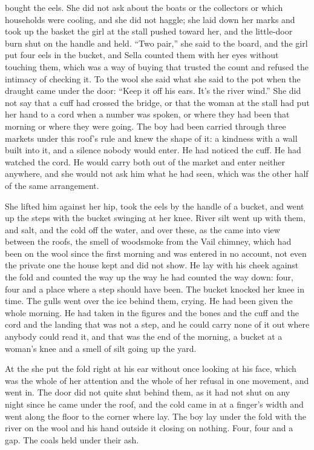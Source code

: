 \scenebreak

 bought the eels. She did not ask about the boats or the collectors or which households were cooling, and she did not haggle; she laid down her marks and took up the basket the girl at the stall pushed toward her, and the little-door burn shut on the handle and held. “Two pair,” she said to the board, and the girl put four eels in the bucket, and Sella counted them with her eyes without touching them, which was a way of buying that trusted the count and refused the intimacy of checking it. To the wool she said what she said to the pot when the draught came under the door: “Keep it off his ears. It's the river wind.” She did not say that a cuff had crossed the bridge, or that the woman at the stall had put her hand to a cord when a number was spoken, or where they had been that morning or where they were going. The boy had been carried through three markets under this roof's rule and knew the shape of it: a kindness with a wall built into it, and a silence nobody would enter. He had noticed the cuff. He had watched the cord. He would carry both out of the market and enter neither anywhere, and she would not ask him what he had seen, which was the other half of the same arrangement.

She lifted him against her hip, took the eels by the handle of a bucket, and went up the steps with the bucket swinging at her knee. River silt went up with them, and salt, and the cold off the water, and over these, as the  came into view between the roofs, the smell of woodsmoke from the Vail chimney, which had been on the wool since the first morning and was entered in no account, not even the private one the house kept and did not show. He lay with his cheek against the fold and counted the way up the way he had counted the way down: four, four and a place where a step should have been. The bucket knocked her knee in time. The gulls went over the ice behind them, crying. He had been given the whole morning. He had taken in the figures and the bones and the cuff and the cord and the landing that was not a step, and he could carry none of it out where anybody could read it, and that was the end of the morning, a bucket at a woman's knee and a smell of silt going up the yard.

At the  she put the fold right at his ear without once looking at his face, which was the whole of her attention and the whole of her refusal in one movement, and went in. The door did not quite shut behind them, as it had not shut on any night since he came under the roof, and the cold came in at a finger's width and went along the floor to the corner where  lay. The boy lay under the fold with the river on the wool and his hand outside it closing on nothing. Four, four and a gap. The coals held under their ash.

